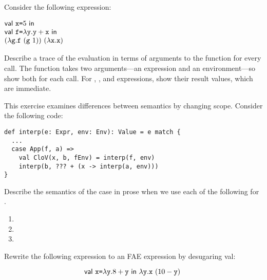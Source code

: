 \begin{exercise}

Consider the following expression:

$\begin{array}{@{}l}
\ebind{\cx}{5}{\\
    \ebind{\code{f}}{\efun{\cy}{\eadd{\cy}{\cx}}}{\\
        \eapp{(\efun{\code{g}}{\eapp{\code{f}}{(\eapp{\code{g}}{1})}})}
        {(\efun{\cx}{\cx})}
    }
}
\end{array}$

Describe a trace of the evaluation in terms of arguments to the 
function for every call. The  function takes two arguments---an
expression and an environment---so show both for each call.  For ,
, and  expressions, show their result values, which are
immediate.

\end{exercise}

\begin{exercise}

This exercise examines differences between semantics by changing scope.
Consider the following code:

\begin{verbatim}
def interp(e: Expr, env: Env): Value = e match {
  ...
  case App(f, a) =>
    val CloV(x, b, fEnv) = interp(f, env)
    interp(b, ??? + (x -> interp(a, env)))
}
\end{verbatim}

Describe the semantics of the  case in prose
when we use each of the following for .
\begin{enumerate}
  \item {}
  \item {}
  \item {}
\end{enumerate}

\end{exercise}

\begin{exercise}

Rewrite the following \lang expression to an \textsf{FAE} expression by
desugaring \textsf{val}:

\[
  \textsf{val}\ \texttt{x}\texttt{=}\lambda\texttt{y}.8+\texttt{y}\ \textsf{in}\ \lambda\texttt{y}.\texttt{x}\ (10-\texttt{y})\ \]

\end{exercise}

